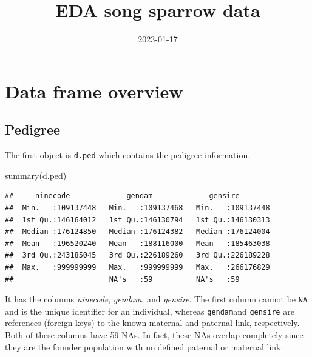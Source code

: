 \documentclass[
]{article}
\title{EDA song sparrow data}
\author{}
\date{\vspace{-2.5em}2023-01-17}
\newenvironment{Shaded}{\begin{snugshade}}{\end{snugshade}}
\newcommand{\FunctionTok}[1]{\textcolor[rgb]{0.00,0.00,0.00}{#1}}
\newcommand{\NormalTok}[1]{#1}
\newcommand{\SpecialCharTok}[1]{\textcolor[rgb]{0.00,0.00,0.00}{#1}}
\newcommand{\StringTok}[1]{\textcolor[rgb]{0.31,0.60,0.02}{#1}}
\begin{document}
\maketitle

\hypertarget{data-frame-overview}{%
\section*{Data frame overview}\label{data-frame-overview}}

\hypertarget{pedigree}{%
\subsection*{Pedigree}\label{pedigree}}

The first object is \texttt{d.ped} which contains the pedigree
information.

\begin{Shaded}
\begin{Highlighting}[]
\FunctionTok{summary}\NormalTok{(d.ped)}
\end{Highlighting}
\end{Shaded}

\begin{verbatim}
##     ninecode             gendam             gensire         
##  Min.   :109137448   Min.   :109137468   Min.   :109137448  
##  1st Qu.:146164012   1st Qu.:146130794   1st Qu.:146130313  
##  Median :176124850   Median :176124382   Median :176124004  
##  Mean   :196520240   Mean   :188116000   Mean   :185463038  
##  3rd Qu.:243185045   3rd Qu.:226189260   3rd Qu.:226189228  
##  Max.   :999999999   Max.   :999999999   Max.   :266176829  
##                      NA's   :59          NA's   :59
\end{verbatim}

It has the columns \emph{ninecode}, \emph{gendam}, and \emph{gensire}.
The first column cannot be \texttt{NA} and is the unique identifier for
an individual, whereas \texttt{gendam}and \texttt{gensire} are
references (foreign keys) to the known maternal and paternal link,
respectively. Both of these columns have 59 NAs. In fact, these NAs
overlap completely since they are the founder population with no defined
paternal or maternal link:

\begin{Shaded}
\end{Shaded}
\end{document}
